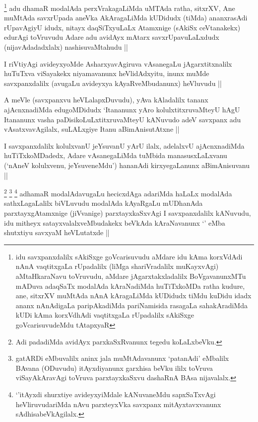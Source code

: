 \begin{artha}
\footnote{idu savxpanxdalilx sAkiSxge goVcarisuvudu aMdare idu kAma korxVdAdi nAnA vaqtitxgaLa rUpadalilx (liMga shariVradalilx muKayxvAgi) aMtaHkaraNavu toVruvudu, aMdare jAgarxtakxladalilx BoVgavanunxMTu mADuva adaqSaTx modalAda kAraNadiMda huTiTxkoMDa ratha kudure, ane, sitxrXV muMtAda nAnA kAragaLiMda kUDidudx tiMdu kuDidu idadx ananx nAnAdigaLa paripAkadiMda pariNamisida rasagaLa sahakAradiMda kUDi kAma korxVdhAdi vaqtitxgaLa rUpadalilx sAkiSxge goVcarisuvudeMdu tAtapxyaR}
adu dhamaR modalAda perxVrakagaLiMda uMTAda ratha, sitxrXV, Ane muMtAda savxrUpada aneVka AkAragaLiMda kUDidudx (tiMda) ananxrasAdi rUpavAgiyU idudx, nitayx daqSiTxyuLaLx Atamxnige (sAkiSx ceVtanakekx) edurAgi toVruvudu Adare adu avidAyx mAtarx savxrUpavuLaLxdudx (nijavAdadadxlalx) nashisuvaMtahudu || 
\end{artha}

\begin{artha}
I riVtiyAgi avideyxyoMde AsharxyavAgiruva vAsanegaLu jAgarxtitxnalilx huTuTxva viSayakekx niyamavanunx heVlidAdxyitu, inunx muMde savxpanxdalilx (avugaLu avideyxya kAyaRveMbudanunx) heVluvudu ||
\end{artha}


\begin{artha}
A meVle (savxpanxvu heVLalapxDuvudu), yAva kAladalilx tananx ajAcnxnadiMda edugoMDidudx `Itananunx yAro kolulxtitxruvaMteyU hAgU Itananunx vasha paDisikoLuLxtitxruvaMteyU kANuvudo adeV savxpanx adu vAsatxvavAgilalx, suLALxgiye Itanu aBimAnisutAtxne ||
\end{artha}


\begin{artha}
I savxpanxdalilx kolulxvanU jeYsuvanU yArU ilalx, adelalxvU ajAcnxnadiMda huTiTxkoMDadedx, Adare vAsanegaLiMda tuMbida manasusxLaLxvanu (`nAneV kolulxvenu, jeYsuveneMdu') hananAdi kirxyegaLanunx aBimAnisuvanu ||
\end{artha}


\begin{artha}
\footnote{Adi padadiMda avidAyx parxkaSxRvanunx tegedu koLaLxbeVku.}
\footnote{gatARDi eMbuvalilx aninx jala muMtAdavanunx `patanAdi' eMbalilx BAvana (ODuvudu) itAyxdiyanunx garxhisa beVku ililx toVruva viSayAkAravAgi toVruva parxtayxkaSxvu dashaRnA BAsa nijavalalx.}
\footnote{`\stext'itAyxdi shurxtiye avideyxyiMdale kANuvaneMdu sapxSaTxvAgi heVliruvudariMda nAvu parxteyxVka savxpanx mitAyxtavxvanunx sAdhisabeVkAgilalx.}
adhamaR modalAdavugaLu hecicxdAga adariMda haLaLx modalAda sathxLagaLalilx biVLuvudu modalAda kAyaRgaLu mUDhanAda parxtayxgAtamxnige (jiVvanige) parxtayxkaSxvAgi I savxpanxdalilx kANuvudu, idu mitheyx satayxvalalxveMbudakekx beVkAda kAraNavanunx `\stext' eMba shutxtiyu savxyaM heVLutatxde ||
\end{artha}

